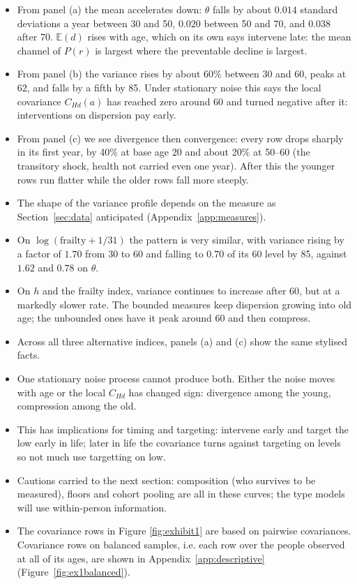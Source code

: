 \documentclass[11pt]{article}
\newcommand{\E}{\mathbb{E}}
\begin{document}
	\begin{itemize}
		\item From panel (a) the mean accelerates down: $\theta$ falls by about $0.014$ standard deviations a year between 30 and 50, $0.020$ between 50 and 70, and $0.038$ after 70. $\E(d)$ rises with age, which on its own says intervene late: the mean channel of $P(r)$ is largest where the preventable decline is largest.
		\item From panel (b) the variance rises by about 60\% between 30 and 60, peaks at 62, and falls by a fifth by 85. Under stationary noise this says the local covariance $C_{Hd}(a)$ has reached zero around 60 and turned negative after it: interventions on dispersion pay early.
		\item From panel (c) we see divergence then convergence: every row drops sharply in its first year, by 40\% at base age 20 and about 20\% at 50--60 (the transitory shock, health not carried even one year). After this the younger rows run flatter while the older rows fall more steeply.
		\item The shape of the variance profile depends on the measure as Section~\ref{sec:data} anticipated (Appendix~\ref{app:measures}).
		\item On $\log(\text{frailty}+1/31)$ the pattern is very similar, with variance rising by a factor of $1.70$ from 30 to 60 and falling to $0.70$ of its 60 level by 85, against $1.62$ and $0.78$ on $\theta$.
		\item On $h$ and the frailty index, variance continues to increase after 60, but at a markedly slower rate. The bounded measures keep dispersion growing into old age; the unbounded ones have it peak around 60 and then compress.
		\item Across all three alternative indices, panels (a) and (c) show the same stylised facts.
		\item One stationary noise process cannot produce both. Either the noise moves with age or the local $C_{Hd}$ has changed sign: divergence among the young, compression among the old. 
		\item This has implications for timing and targeting: intervene early and target the low early in life; later in life the covariance turns against targeting on levels so not much use targetting on low.
		\item Cautions carried to the next section: composition (who survives to be measured), floors and cohort pooling are all in these curves; the type models will use within-person information.
		\item The covariance rows in Figure \ref{fig:exhibit1} are based on pairwise covariances. Covariance rows on balanced samples, i.e. each row over the people observed at all of its ages, are shown in Appendix~\ref{app:descriptive} (Figure~\ref{fig:ex1balanced}).
	\end{itemize}
	
\end{document}
